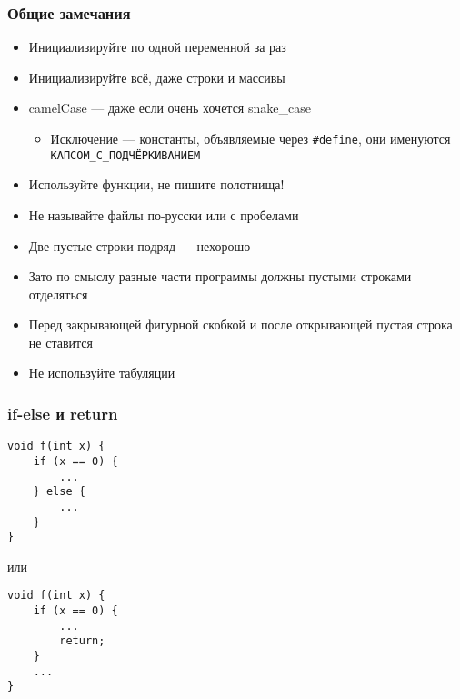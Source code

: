\documentclass{../../slides-style}
\begin{document}
    
    \begin{frame}[plain]
        \titlepage
    \end{frame}

    \begin{frame}[fragile]
        \frametitle{Общие замечания}
        \begin{itemize}
            \item Инициализируйте по одной переменной за раз
            \item Инициализируйте всё, даже строки и массивы
            \item camelCase --- даже если очень хочется snake\_case
            \begin{itemize}
                \item Исключение --- константы, объявляемые через \texttt{#define}, они именуются \texttt{КАПСОМ_С_ПОДЧЁРКИВАНИЕМ}
            \end{itemize}
            \item Используйте функции, не пишите полотнища!
            \item Не называйте файлы по-русски или с пробелами
            \item Две пустые строки подряд --- нехорошо
            \item Зато по смыслу разные части программы должны пустыми строками отделяться
            \item Перед закрывающей фигурной скобкой и после открывающей пустая строка не ставится
            \item Не используйте табуляции
        \end{itemize}
    \end{frame}

    \begin{frame}[fragile]
        \frametitle{if-else и return}
        \begin{verbatim}
void f(int x) {
    if (x == 0) {
        ...
    } else {
        ...
    }
}
        \end{verbatim}
        или
        \begin{verbatim}
void f(int x) {
    if (x == 0) {
        ...
        return;
    } 
    ...
}
        \end{verbatim}
    \end{frame}
\end{document}

